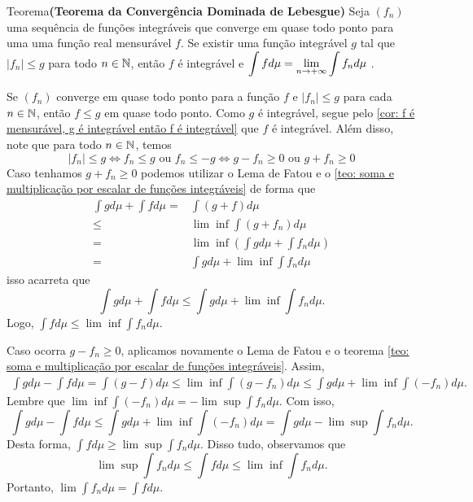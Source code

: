 \begin{env}{Teorema}\textbf{(Teorema da Convergência Dominada de Lebesgue)}
	Seja $(f_n)$ uma sequência de funções integráveis que converge em quase todo ponto para uma uma função real mensurável $f$.
	Se existir uma função integrável $g$ tal que $|f_n| \leq g$ para todo $n \in \operatorname{\mathbb{N}}$, então $f$ é integrável e $\displaystyle \int f d\mu = \displaystyle \lim_{n \to +\infty} \int f_n d\mu$ \cite{bartle}.
\end{env}

\begin{prova}
	Se $(f_n)$ converge em quase todo ponto para a função $f$ e $|f_n| \leq g$ para cada $n \in \operatorname{\mathbb{N}}$, então $f \leq g$ em quase todo ponto.
	Como $g$ é integrável, segue pelo \ref{cor: f é mensurável, g é integrável então f é integrável} que $f$ é integrável.
	Além disso, note que para todo $n \in \operatorname{\mathbb{N}}$, temos
	$$
	|f_n| \leq g 
	\Leftrightarrow 
	f_n \leq g 
	\textrm{\ ou \ }
	 f_n \leq -g
	\Leftrightarrow
	g - f_n \geq 0
	\textrm{\ ou \ }
	g + f_n \geq 0
	$$
	Caso tenhamos $g + f_n \geq 0$ podemos utilizar o Lema de Fatou e o \ref{teo: soma e multiplicação por escalar de funções integráveis} de forma que 
	\begin{align*}
		\int g d\mu + \int f d\mu =& \int (g + f) d\mu \\
		\leq & \lim \inf \int (g + f_n) d\mu \\
		=& \lim \inf \left(\int g d\mu + \int f_n d\mu\right)\\
		=& \int g d\mu + \lim \inf \int f_n d\mu
	\end{align*}
	isso acarreta que 
	$$
	\int g d\mu + \int f d\mu \leq  \int g d\mu + \lim \inf \int f_n d\mu.
	$$
	Logo, $\displaystyle \int f d\mu \leq \lim \inf \int f_n d\mu$.
	
	Caso ocorra $g - f_n \geq 0$, aplicamos novamente o Lema de Fatou e o teorema \ref{teo: soma e multiplicação por escalar de funções integráveis}.
	Assim, 
	\begin{align*}
		\int g d\mu - \int f d\mu = \int (g - f) d\mu
		\leq  \lim \inf \int (g - f_n) d\mu
		\leq \int g d\mu + \lim \inf \int (- f_n) d\mu.
	\end{align*}
	Lembre que $\displaystyle \lim \inf \int (- f_n) d\mu = - \lim \sup \int f_n d\mu$.
	Com isso, 
	$$
	\int g d\mu - \int f d\mu \leq 
	\int g d\mu + \lim \inf \int (- f_n) d\mu
	=
	\int g d\mu - \lim \sup \int f_n d\mu.
	$$
	Desta forma, $\displaystyle \int f d\mu \geq \lim \sup \int f_n d\mu$.
	Disso tudo, observamos que 
	$$
	\lim \sup \int f_n d\mu \leq  \int f d\mu \leq \lim \inf \int f_n d\mu. 
	$$
	Portanto, $\displaystyle \lim \int f_n d\mu =  \int f d\mu $.
\end{prova}























